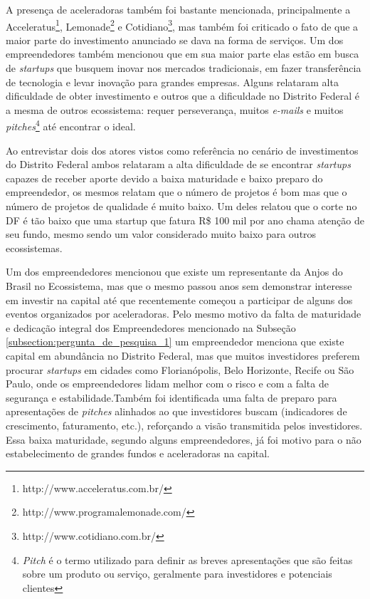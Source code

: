A presença de aceleradoras também foi bastante mencionada, principalmente a Acceleratus\footnote{http://www.acceleratus.com.br/}, Lemonade\footnote{http://www.programalemonade.com/} e Cotidiano\footnote{http://www.cotidiano.com.br/}, mas também foi criticado o fato de que a maior parte do investimento anunciado se dava na forma de serviços. Um dos empreendedores também mencionou que em sua maior parte elas estão em busca de \textit{startups} que busquem inovar nos mercados tradicionais, em fazer transferência de tecnologia e levar inovação para grandes empresas. Alguns relataram alta dificuldade de obter investimento e outros que a dificuldade no Distrito Federal é a mesma de outros ecossistema: requer perseverança, muitos \textit{e-mails} e muitos \textit{pitches}\footnote{\textit{Pitch} é o termo utilizado para definir as breves apresentações que são feitas sobre um produto ou serviço, geralmente para investidores e potenciais clientes} até encontrar o ideal.

Ao entrevistar dois dos atores vistos como referência no cenário de investimentos do Distrito Federal ambos relataram a alta dificuldade de se encontrar \textit{startups} capazes de receber aporte devido a baixa maturidade e baixo preparo do empreendedor, os mesmos relatam que o número de projetos é bom mas que o número de projetos de qualidade é muito baixo. Um deles relatou que o corte no DF é tão baixo que uma startup que fatura R\$ 100 mil por ano chama atenção de seu fundo, mesmo sendo um valor considerado muito baixo para outros ecossistemas. 

Um dos empreendedores mencionou que existe um representante da Anjos do Brasil no Ecossistema, mas que o mesmo passou anos sem demonstrar interesse em investir na capital até que recentemente começou a participar de alguns dos eventos organizados por aceleradoras. Pelo mesmo motivo da falta de maturidade e dedicação integral dos Empreendedores mencionado na Subseção \ref{subsection:pergunta_de_pesquisa_1} um empreendedor menciona que existe capital em abundância no Distrito Federal, mas que muitos investidores preferem procurar \textit{startups} em cidades como Florianópolis, Belo Horizonte, Recife ou São Paulo, onde os empreendedores lidam melhor com o risco e com a falta de segurança e estabilidade.Também foi identificada uma falta de preparo para apresentações de \textit{pitches} alinhados ao que investidores buscam (indicadores de crescimento, faturamento, etc.), reforçando a visão transmitida pelos investidores. Essa baixa maturidade, segundo alguns empreendedores, já foi motivo para o não estabelecimento de grandes fundos e aceleradoras na capital.

